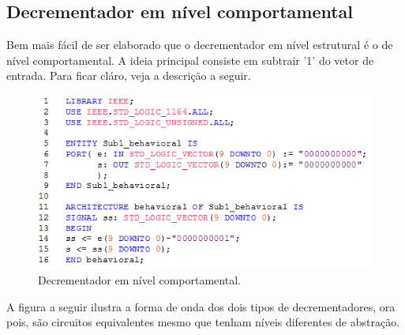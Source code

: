 \documentclass[12pt,a4paper]{article}
\begin{document}
\newpage
\subsection{Decrementador em nível comportamental}

Bem mais fácil de ser elaborado que o decrementador em nível estrutural é o de nível comportamental. A ideia principal consiste em subtrair '1' do vetor de entrada. Para ficar cláro, veja a descrição a seguir.\begin{figure}[h]\includegraphics{fig3.png}\caption{Decrementador em nível comportamental.}\label{fg:decrementador_comportamental}\end{figure}


A figura a seguir ilustra a forma de onda dos dois tipos de decrementadores, ora pois, são circuitos equivalentes mesmo que tenham níveis diferentes de abstração.
\end{document}
